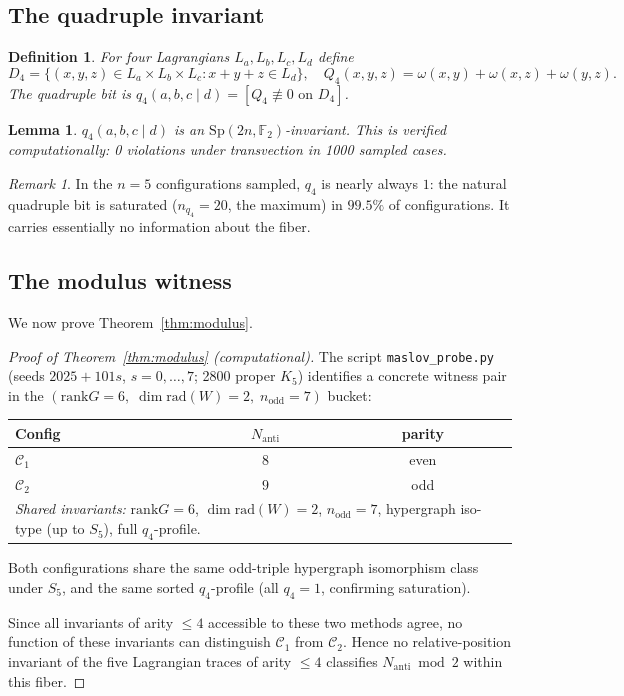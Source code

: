 \documentclass[11pt,a4paper]{article}
\newtheorem{lemma}[theorem]{Lemma}
\newtheorem{definition}[theorem]{Definition}
\theoremstyle{remark}
\newtheorem{remark}[theorem]{Remark}
\newcommand{\Sp}{\mathrm{Sp}}
\newcommand{\rad}{\mathrm{rad}}
\newcommand{\rank}{\mathrm{rank}}
\newcommand{\Nanti}{N_{\mathrm{anti}}}
\begin{document}
\subsection{The quadruple invariant}

\begin{definition}\label{def:q4}
For four Lagrangians $L_a,L_b,L_c,L_d$ define
\[
  D_4 = \{(x,y,z)\in L_a\times L_b\times L_c : x+y+z\in L_d\},
  \quad
  Q_4(x,y,z) = \omega(x,y)+\omega(x,z)+\omega(y,z).
\]
The \emph{quadruple bit} is $q_4(a,b,c\mid d)=[Q_4\not\equiv0\text{ on }D_4]$.
\end{definition}

\begin{lemma}
$q_4(a,b,c\mid d)$ is an $\Sp(2n,\mathbb F_2)$-invariant.
This is verified computationally: 0 violations under transvection in 1000 sampled cases.
\end{lemma}

\begin{remark}
In the $n=5$ configurations sampled, $q_4$ is nearly always $1$: the natural quadruple
bit is saturated ($n_{q_4}=20$, the maximum) in $99.5\%$ of configurations.
It carries essentially no information about the fiber.
\end{remark}

\subsection{The modulus witness}

We now prove Theorem~\ref{thm:modulus}.

\begin{proof}[Proof of Theorem~\ref{thm:modulus} (computational)]
The script \texttt{maslov\_probe.py}~\cite{PaperXIXsuppl}
(seeds $2025+101s$, $s=0,\ldots,7$; 2800 proper $K_5$)
identifies a concrete witness pair in the
$(\rank G=6,\;\dim\rad(W)=2,\;n_{\mathrm{odd}}=7)$ bucket:

\begin{center}
\begin{tabular}{lcc}
\toprule
Config & $\Nanti$ & parity \\
\midrule
$\mathcal C_1$ & $8$ & even \\
$\mathcal C_2$ & $9$ & odd \\
\midrule
\multicolumn{3}{p{9cm}}{\textit{Shared invariants:}
  $\rank G=6$, $\dim\rad(W)=2$, $n_{\mathrm{odd}}=7$,
  hypergraph iso-type (up to $S_5$), full $q_4$-profile.}\\
\bottomrule
\end{tabular}
\end{center}

Both configurations share the same odd-triple hypergraph isomorphism class under $S_5$,
and the same sorted $q_4$-profile (all $q_4=1$, confirming saturation).

Since all invariants of arity $\le4$ accessible to these two methods agree, no function
of these invariants can distinguish $\mathcal C_1$ from $\mathcal C_2$.  Hence no
relative-position invariant of the five Lagrangian traces of arity $\le4$ classifies
$\Nanti\bmod2$ within this fiber.
\end{proof}
\end{document}
